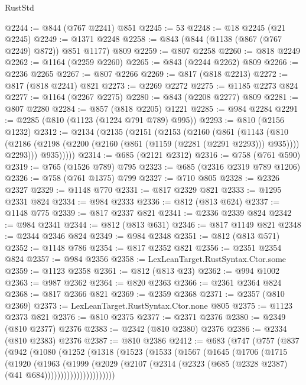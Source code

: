 \begin{lexlean}{RustStd}
\begin{coremodule}
@2244 := @844 (@767 @2241) @851
@2245 := 53
@2248 := @18 @2245 (@21 @2245)
@2249 := @1371 @2248
@2258 := @843 (@844 (@1138 (@867 (@767 @2249) @872)) @851 @1177) @809
@2259 := @807 @2258
@2260 := @818 @2249
@2262 := @1164 (@2259 @2260)
@2265 := @843 (@2244 @2262) @809
@2266 := @2236 @2265
@2267 := @807 @2266
@2269 := @817 (@818 @2213)
@2272 := @817 (@818 @2241) @821
@2273 := @2269 @2272
@2275 := @1185 @2273 @824
@2277 := @1164 (@2267 @2275)
@2280 := @843 (@2208 @2277) @809
@2281 := @807 @2280
@2284 := @857 (@818 @2205) @1221
@2285 := @984 @2284
@2291 := @2285 (@810 (@1123 (@1224 @791 @789) @995))
@2293 := @810 (@2156 @1232)
@2312 := @2134
    (@2135
      (@2151
        (@2153
          (@2160
            (@861
              (@1143
                (@810
                  (@2186 (@2198 (@2200 (@2160 (@861 (@1159 (@2281 (@2291 @2293))) @935)))) @2293)))
              @935)))))
@2314 := @685 (@2121 @2312)
@2316 := @758 (@761 @590)
@2319 := @765 (@1526 @789) @795
@2323 := @685 (@2316 @2319 @789 @1206)
@2326 := @758 (@761 @1375) @799
@2327 := @710 @805
@2328 := @2326 @2327
@2329 := @1148 @770
@2331 := @817 @2329 @821
@2333 := @1295 @2331 @824
@2334 := @984 @2333
@2336 := @812 (@813 @624)
@2337 := @1148 @775
@2339 := @817 @2337 @821
@2341 := @2336 @2339 @824
@2342 := @984 @2341
@2344 := @812 (@813 @631)
@2346 := @817 @1149 @821
@2348 := @2344 @2346 @824
@2349 := @984 @2348
@2351 := @812 (@813 @571)
@2352 := @1148 @786
@2354 := @817 @2352 @821
@2356 := @2351 @2354 @824
@2357 := @984 @2356
@2358 := LexLeanTarget.RustSyntax.Ctor.some
@2359 := @1123 @2358
@2361 := @812 (@813 @23)
@2362 := @994 @1002
@2363 := @987 @2362
@2364 := @820 @2363
@2366 := @2361 @2364 @824
@2368 := @817 @2366 @821
@2369 := @2359 @2368
@2371 := @2357 (@810 @2369)
@2373 := LexLeanTarget.RustSyntax.Ctor.none @805
@2375 := @1123 @2373 @821
@2376 := @810 @2375
@2377 := @2371 @2376
@2380 := @2349 (@810 @2377) @2376
@2383 := @2342 (@810 @2380) @2376
@2386 := @2334 (@810 @2383) @2376
@2387 := @810 @2386
@2412 := @683
    (@747
      (@757
        (@837
          (@942
            (@1080
              (@1252
                (@1318
                  (@1523
                    (@1533
                      (@1567
                        (@1645
                          (@1706
                            (@1715
                              (@1920
                                (@1963
                                  (@1999
                                    (@2029
                                      (@2107
                                        (@2314
                                          (@2323 (@685 (@2328 @2387) (@41 @684))))))))))))))))))))))

\end{coremodule}
\end{lexlean}
